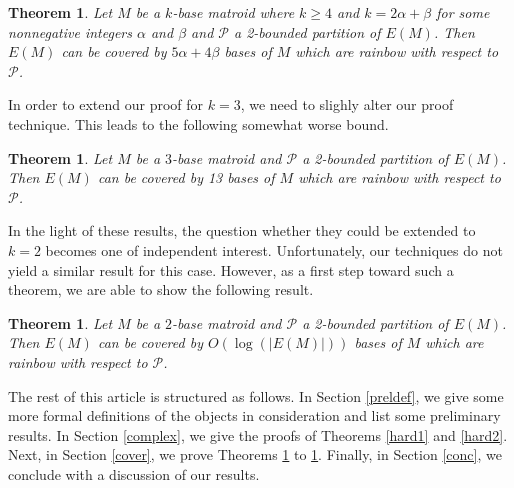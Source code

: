 \documentclass{article}
\newtheorem{Theorem}[Statement]{Theorem}
\begin{document}
\begin{Theorem}\label{k41}
Let $M$ be a $k$-base matroid where $k\geq 4$ and $k=2 \alpha+ \beta$ for some nonnegative integers $\alpha$ and $\beta$ and $\mathcal{P}$ a 2-bounded partition of $E(M)$. Then $E(M)$ can be covered by $5 \alpha+4\beta$ bases of $M$ which are rainbow  with respect to $\mathcal{P}$.
\end{Theorem}


In order to extend our proof for $k=3$, we need to slighly alter our proof technique. This leads to the following somewhat worse bound.

\begin{Theorem}\label{k412}
Let $M$ be a $3$-base matroid and $\mathcal{P}$ a 2-bounded partition of $E(M)$. Then $E(M)$ can be covered by 13 bases of $M$ which are rainbow  with respect to $\mathcal{P}$.
\end{Theorem}



In the light of these results, the question whether they could be extended to $k=2$ becomes one of independent interest. 
Unfortunately, our techniques do not yield a similar result for this case. However, as a first step toward such a theorem, we are able to show the following result.

\begin{Theorem}\label{doublecover}
Let $M$ be a $2$-base matroid and $\mathcal{P}$ a 2-bounded partition of $E(M)$. Then $E(M)$ can be covered by $O(\log(|E(M)|))$ bases of $M$ which are rainbow  with respect to $\mathcal{P}$.
\end{Theorem}

The rest of this article is structured as follows. In Section \ref{preldef}, we give some more formal definitions of the objects in consideration and list some preliminary results. In Section \ref{complex}, we give the proofs of Theorems \ref{hard1} and \ref{hard2}. Next, in Section \ref{cover}, we prove Theorems \ref{k41} to \ref{doublecover}. Finally, in Section \ref{conc}, we conclude with a discussion of our results.
\end{document}
